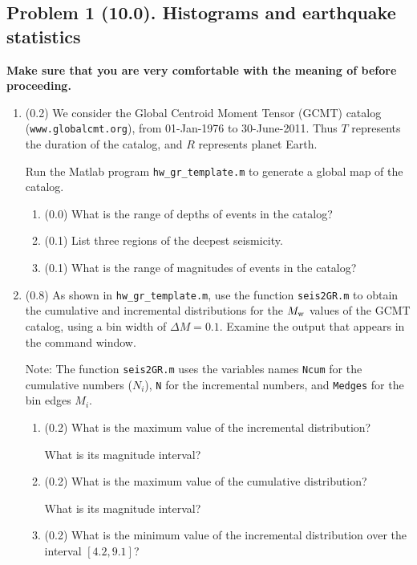 \documentclass[11pt,titlepage,fleqn]{article}
\begin{document}


\subsection*{Problem 1 (10.0). Histograms and earthquake statistics}

{\bf Make sure that you are very comfortable with the meaning of  before proceeding.}

\begin{enumerate}
\item (0.2) We consider the Global Centroid Moment Tensor (GCMT) catalog (\verb+www.globalcmt.org+), from 01-Jan-1976 to 30-June-2011. Thus $T$ represents the duration of the catalog, and $R$ represents planet Earth.

Run the Matlab program \verb+hw_gr_template.m+ to generate a global map of the catalog.
%
\begin{enumerate}
\item (0.0) What is the range of depths of events in the catalog?
\item (0.1) List three regions of the deepest seismicity.
\item (0.1) What is the range of magnitudes of events in the catalog?
\end{enumerate}

\item (0.8) As shown in \verb+hw_gr_template.m+, use the function \verb+seis2GR.m+ to obtain the cumulative and incremental distributions for the $M_{\rm w}$ values of the GCMT catalog, using a bin width of $\Delta M = 0.1$. Examine the output that appears in the command window.

Note: The function \verb+seis2GR.m+ uses the variables names \verb+Ncum+ for the cumulative numbers ($N_i$), \verb+N+ for the incremental numbers, and \verb+Medges+ for the bin edges $M_i$.

\begin{enumerate}
\item (0.2) What is the maximum value of the incremental distribution?

What is its magnitude interval?

\item (0.2) What is the maximum value of the cumulative distribution?

What is its magnitude interval?

\item (0.2) What is the minimum value of the incremental distribution over the interval $[4.2,9.1]$? 


\end{enumerate}
\end{enumerate}
\end{document}
